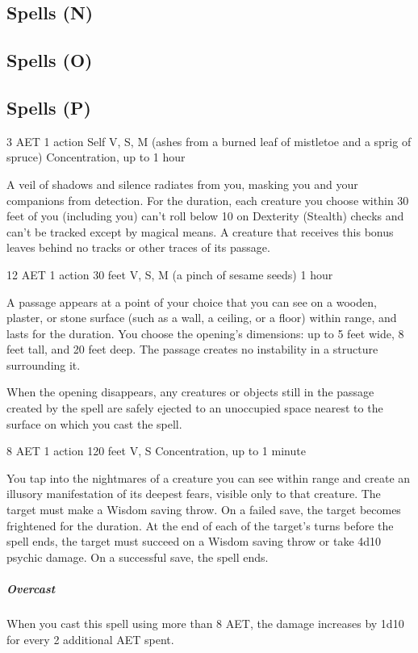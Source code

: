 \subsection{Spells (N)}

\subsection{Spells (O)}

\subsection{Spells (P)}

\label{spell:pass-without-trace}
{3 AET}
{1 action}
{Self}
{V, S, M (ashes from a burned leaf of mistletoe and a sprig of spruce)}
{Concentration, up to 1 hour}

A veil of shadows and silence radiates from you, masking you and your companions from detection. For the duration, each creature you choose within 30 feet of you (including you) can't roll below 10 on Dexterity (Stealth) checks and can't be tracked except by magical means. A creature that receives this bonus leaves behind no tracks or other traces of its passage.

\label{spell:passwall}
{12 AET}
{1 action}
{30 feet}
{V, S, M (a pinch of sesame seeds)}
{1 hour}

A passage appears at a point of your choice that you can see on a wooden, plaster, or stone surface (such as a wall, a ceiling, or a floor) within range, and lasts for the duration. You choose the opening's dimensions: up to 5 feet wide, 8 feet tall, and 20 feet deep. The passage creates no instability in a structure surrounding it.

When the opening disappears, any creatures or objects still in the passage created by the spell are safely ejected to an unoccupied space nearest to the surface on which you cast the spell.

\label{spell:phantasmal-killer}
{8 AET}
{1 action}
{120 feet}
{V, S}
{Concentration, up to 1 minute}

You tap into the nightmares of a creature you can see within range and create an illusory manifestation of its deepest fears, visible only to that creature. The target must make a Wisdom saving throw. On a failed save, the target becomes frightened for the duration. At the end of each of the target's turns before the spell ends, the target must succeed on a Wisdom saving throw or take 4d10 psychic damage. On a successful save, the spell ends.
\subparagraph*{Overcast} When you cast this spell using more than 8 AET, the damage increases by 1d10 for every 2 additional AET spent.

